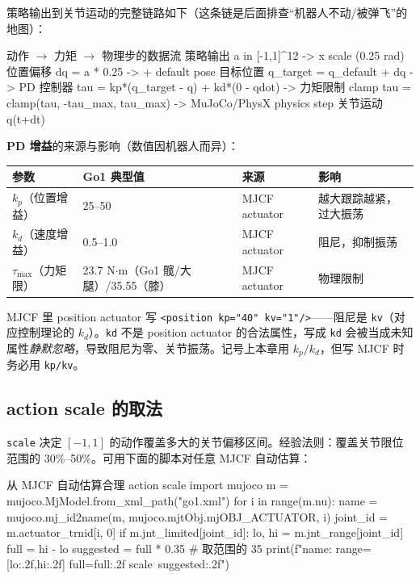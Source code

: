 策略输出到关节运动的完整链路如下（这条链是后面排查“机器人不动/被弹飞”的地图）：

\begin{codebox}{动作 $\to$ 力矩 $\to$ 物理步的数据流}
策略输出 a in [-1,1]^12
  -> x scale (0.25 rad)        位置偏移 dq = a * 0.25
  -> + default pose            目标位置 q_target = q_default + dq
  -> PD 控制器                  tau = kp*(q_target - q) + kd*(0 - qdot)
  -> 力矩限制 clamp             tau = clamp(tau, -tau_max, tau_max)
  -> MuJoCo/PhysX physics step  关节运动 q(t+dt)
\end{codebox}

\textbf{PD 增益}的来源与影响（数值因机器人而异）：

\begin{center}
\small
\begin{tabular}{@{}llll@{}}
\toprule
参数 & Go1 典型值 & 来源 & 影响 \\
\midrule
$k_p$（位置增益） & 25--50 & MJCF actuator & 越大跟踪越紧，过大振荡 \\
$k_d$（速度增益） & 0.5--1.0 & MJCF actuator & 阻尼，抑制振荡 \\
$\tau_{\max}$（力矩限） & 23.7 N$\cdot$m（Go1 髋/大腿）/35.55（膝） & MJCF actuator & 物理限制 \\
\bottomrule
\end{tabular}
\end{center}

\begin{note}
MJCF 里 position actuator 写 \verb|<position kp="40" kv="1"/>|——阻尼是 \verb|kv|（对应控制理论的 $k_d$）。\verb|kd| 不是 position actuator 的合法属性，写成 \verb|kd| 会被当成未知属性\emph{静默忽略}，导致阻尼为零、关节振荡。记号上本章用 $k_p/k_d$，但写 MJCF 时务必用 \verb|kp/kv|。
\end{note}

\subsection{action scale 的取法}
\label{sec:rlmc-ql-action-scale}

\verb|scale| 决定 $[-1,1]$ 的动作覆盖多大的关节偏移区间。经验法则：覆盖关节限位范围的 30\%--50\%。可用下面的脚本对任意 MJCF 自动估算：

\begin{codebox}[Python]{从 MJCF 自动估算合理 action scale}
import mujoco
m = mujoco.MjModel.from_xml_path("go1.xml")
for i in range(m.nu):
    name = mujoco.mj_id2name(m, mujoco.mjtObj.mjOBJ_ACTUATOR, i)
    joint_id = m.actuator_trnid[i, 0]
    if m.jnt_limited[joint_id]:
        lo, hi = m.jnt_range[joint_id]
        full = hi - lo
        suggested = full * 0.35              # 取范围的 35%
        print(f"{name}: range=[{lo:.2f},{hi:.2f}] full={full:.2f} scale~{suggested:.2f}")
\end{codebox}

